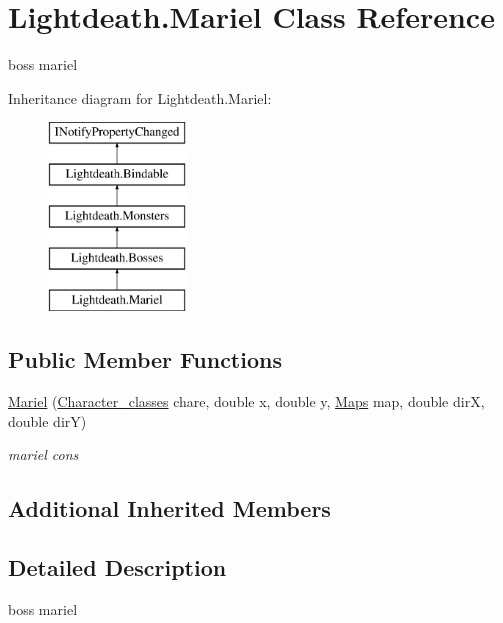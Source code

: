 \hypertarget{class_lightdeath_1_1_mariel}{}\section{Lightdeath.\+Mariel Class Reference}
\label{class_lightdeath_1_1_mariel}


boss mariel  


Inheritance diagram for Lightdeath.\+Mariel\+:\begin{figure}[H]
\begin{center}
\leavevmode
\includegraphics[height=5.000000cm]{class_lightdeath_1_1_mariel}
\end{center}
\end{figure}
\subsection*{Public Member Functions}
\begin{DoxyCompactItemize}
\item 
\hyperlink{class_lightdeath_1_1_mariel_aac4bd63c664db849d055bc52bdf5a0eb}{Mariel} (\hyperlink{class_lightdeath_1_1_character__classes}{Character\+\_\+classes} chare, double x, double y, \hyperlink{class_lightdeath_1_1_maps}{Maps} map, double dirX, double dirY)
\begin{DoxyCompactList}\small\item\em mariel cons \end{DoxyCompactList}\end{DoxyCompactItemize}
\subsection*{Additional Inherited Members}


\subsection{Detailed Description}
boss mariel 



